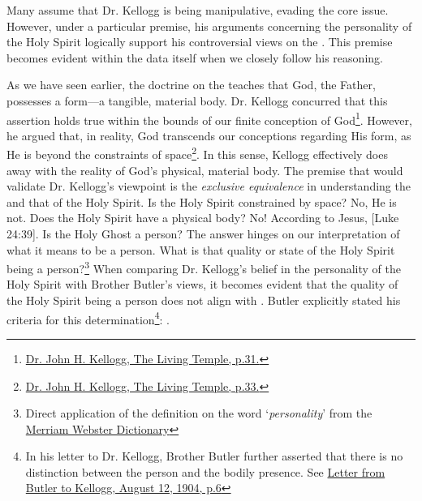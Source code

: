 Many assume that Dr. Kellogg is being manipulative, evading the core issue. However, under a particular premise, his arguments concerning the personality of the Holy Spirit logically support his controversial views on the . This premise becomes evident within the data itself when we closely follow his reasoning.

As we have seen earlier, the doctrine on the  teaches that God, the Father, possesses a form—a tangible, material body. Dr. Kellogg concurred that this assertion holds true within the bounds of our finite conception of God\footnote{\href{https://archive.org/details/J.H.Kellogg.TheLivingTemple1903/page/n33/}{Dr. John H. Kellogg, The Living Temple, p.31.}}. However, he argued that, in reality, God transcends our conceptions regarding His form, as He is beyond the constraints of space\footnote{\href{https://archive.org/details/J.H.Kellogg.TheLivingTemple1903/page/n33/}{Dr. John H. Kellogg, The Living Temple, p.33.}}. In this sense, Kellogg effectively does away with the reality of God’s physical, material body. The premise that would validate Dr. Kellogg’s viewpoint is the \textit{exclusive equivalence} in understanding the  and that of the Holy Spirit. Is the Holy Spirit constrained by space? No, He is not. Does the Holy Spirit have a physical body? No! According to Jesus, [Luke 24:39]. Is the Holy Ghost a person? The answer hinges on our interpretation of what it means to be a person. What is that quality or state of the Holy Spirit being a person?\footnote{Direct application of the definition on the word ‘\textit{personality}’ from the \href{https://www.merriam-webster.com/dictionary/personality}{Merriam Webster Dictionary}} When comparing Dr. Kellogg's belief in the personality of the Holy Spirit with Brother Butler's views, it becomes evident that the quality of the Holy Spirit being a person does not align with . Butler explicitly stated his criteria for this determination\footnote{In his letter to Dr. Kellogg, Brother Butler further asserted that there is no distinction between the person and the bodily presence. See \href{https://c7da.us/egwdl/Butler\%20to\%20Kellogg\%20Aug121904.pdf}{Letter from Butler to Kellogg, August 12, 1904, p.6}}: .

